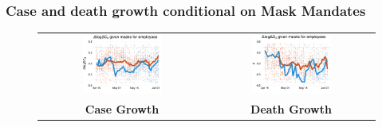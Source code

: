 \documentclass{beamer}
\begin{document}

\begin{frame}
  \frametitle{Case and death growth conditional on \textbf{Mask Mandates }}\vspace{-0.05cm}



\begin{figure}[ht]
  \begin{minipage}{\linewidth}
    \centering
    \begin{tabular}{cc}
      \includegraphics[width=0.5\textwidth]{pmaskbus-cases}
      &
        \includegraphics[width=0.5\textwidth]{pmaskbus-deaths} \\
    \textbf{Case Growth} &    \textbf{Death Growth} \\  
    \end{tabular}
  \end{minipage}
\end{figure}


\end{frame}
\end{document}

